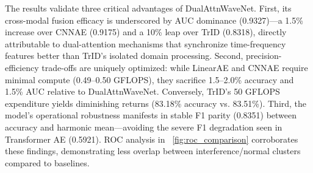\documentclass[conference]{IEEEtran}
\begin{document}
\begin{table}[t]
    \caption{Performance Comparison of DualAttnWaveNet Against Baseline Models}
    \label{tab:main_results}
    \centering
\end{table}

The results validate three critical advantages of DualAttnWaveNet. First, its cross-modal fusion efficacy is underscored by AUC dominance (0.9327)—a 1.5\% increase over CNNAE (0.9175) and a 10\% leap over TrID (0.8318), directly attributable to dual-attention mechanisms that synchronize time-frequency features better than TrID’s isolated domain processing. Second, precision-efficiency trade-offs are uniquely optimized: while LinearAE and CNNAE require minimal compute (0.49–0.50 GFLOPS), they sacrifice 1.5–2.0\% accuracy and 1.5\% AUC relative to DualAttnWaveNet. Conversely, TrID’s 50 GFLOPS expenditure yields diminishing returns (83.18\% accuracy vs. 83.51\%). Third, the model’s operational robustness manifests in stable F1 parity (0.8351) between accuracy and harmonic mean—avoiding the severe F1 degradation seen in Transformer AE (0.5921). ROC analysis in \figurename~\ref{fig:roc_comparison} corroborates these findings, demonstrating less overlap between interference/normal clusters compared to baselines. 
\end{document}
